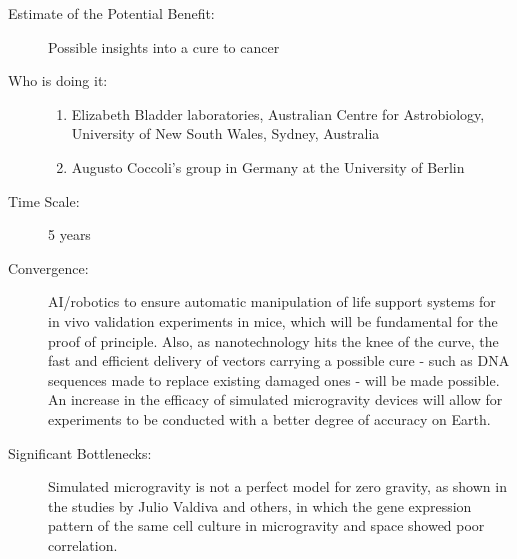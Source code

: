 \begin{description}
\item[Estimate of the Potential  Benefit:] Possible insights into a cure to cancer
 
\item[Who is doing it:] 
\hfill\begin{enumerate}
\item Elizabeth Bladder  laboratories, Australian Centre for Astrobiology, University of New  South Wales, Sydney, Australia
\item  Augusto Coccoli's group in Germany at the University of Berlin
\end{enumerate}
 
\item[Time Scale:] 5 years
 
\item[Convergence:] AI/robotics to  ensure automatic manipulation of life support systems for in vivo  validation experiments in mice, which will be fundamental for the proof  of principle. Also, as nanotechnology hits the knee of the curve, the  fast and efficient delivery of vectors carrying a possible cure - such  as DNA sequences made to replace existing damaged ones - will be made  possible. An increase in the efficacy of simulated microgravity devices  will allow for experiments to be conducted with a better degree of  accuracy on Earth.  
 
\item[Significant Bottlenecks:]  Simulated microgravity is not a perfect model for zero gravity, as shown  in the studies by Julio Valdiva and others, in which the gene  expression pattern of the same cell culture in microgravity and space  showed poor correlation.
 
\end{description} 

